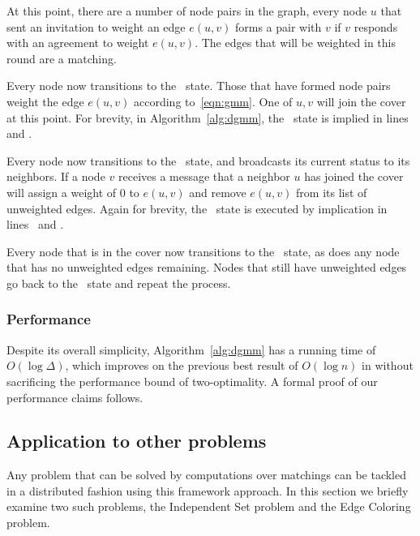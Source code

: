 \documentclass[conference, 10pt, letter]{IEEEtran}
\begin{document}
At this point, there are a number of node pairs in the graph, every node $u$ that sent an invitation to weight an edge $e(u,v)$ forms a pair with $v$ if $v$ responds with an agreement to weight $e(u,v)$. The edges that will be weighted in this round are a matching.

Every node now transitions to the \cUd\ state. Those that have formed node pairs weight the edge $e(u,v)$ according to~\eqref{eqn:gmm}. One of $u,v$ will join the cover at this point. For brevity, in Algorithm~\ref{alg:dgmm}, the \cUd\ state is implied in lines~ and .

Every node now transitions to the \cEd\ state, and broadcasts its current status to its neighbors. If a node $v$ receives a message that a neighbor $u$ has joined the cover will assign a weight of 0 to $e(u,v)$ and remove $e(u,v)$ from its list of unweighted edges. Again for brevity, the \cEd\ state is executed by implication in lines~ and .

Every node that is in the cover now transitions to the \cDd\ state, as does any node that has no unweighted edges remaining. Nodes that still have unweighted edges go back to the \cCd\ state and repeat the process. 



\subsubsection{Performance}

\label{ssb:algorithms-dgmm-performance}

Despite its overall simplicity, Algorithm~\ref{alg:dgmm} has a running time of $O(\log \Delta)$, which improves on the previous best result of $O(\log n)$ in \cite{1582746} without sacrificing the performance bound of two-optimality. A formal proof of our performance claims follows.



\subsection{Application to other problems}
\label{sub:algorithms-other}
Any problem that can be solved by computations over matchings can be tackled in a distributed fashion using this framework approach. In this section we briefly examine two such problems, the Independent Set problem and the Edge Coloring problem.
\end{document}
